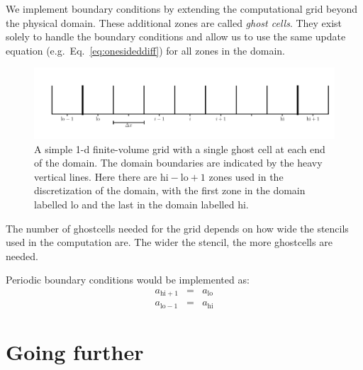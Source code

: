 We implement boundary conditions by extending the computational grid
beyond the physical domain.  These additional zones are called {\em
  ghost cells}.  They exist solely to handle the boundary conditions
and allow us to use the same update equation (e.g.\ Eq.~\ref{eq:onesideddiff})
for all zones in the domain.

\begin{figure}[h]
\centering
\includegraphics[width=\linewidth]{simplegrid_gc}
\caption[A simple 1-d finite-volume grid with ghost cells.]{A simple
  1-d finite-volume grid with a single ghost cell at each end of the
  domain.  The domain boundaries are indicated by the heavy vertical
  lines.  Here there are $\mathrm{hi}-\mathrm{lo}+1$ zones used in the
  discretization of the domain, with the first zone in the domain
  labelled $\mathrm{lo}$ and the last in the domain labelled
  $\mathrm{hi}$.}
\end{figure}

The number of ghostcells needed for the grid depends on how wide the
stencils used in the computation are.  The wider the stencil, the more
ghostcells are needed.

Periodic boundary conditions would be implemented as:
\begin{eqnarray}
a_{\mathrm{hi}+1} &=& a_\mathrm{lo} \\
a_{\mathrm{lo}-1} &=& a_\mathrm{hi}
\end{eqnarray}



\section{Going further}

